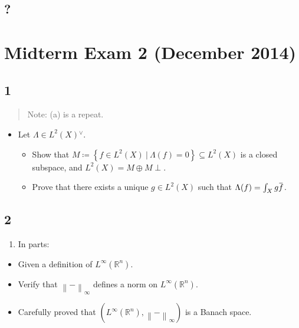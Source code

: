 \hypertarget{section}{%
\subsection{?}\label{section}}

\hypertarget{midterm-exam-2-december-2014}{%
\section{Midterm Exam 2 (December
2014)}\label{midterm-exam-2-december-2014}}

\hypertarget{section-1}{%
\subsection{1}\label{section-1}}

\begin{quote}
Note: (a) is a repeat.
\end{quote}

\begin{itemize}
\tightlist
\item
  Let \(\Lambda\in L^2(X) {}^{ \vee }\).

  \begin{itemize}
  \tightlist
  \item
    Show that
    \(M\coloneqq\left\{{f\in L^2(X) {~\mathrel{\Big|}~}\Lambda(f) = 0}\right\} \subseteq L^2(X)\)
    is a closed subspace, and \(L^2(X) = M \oplus M\perp\).
  \item
    Prove that there exists a unique \(g\in L^2(X)\) such that
    \(\Lambda(f) = \int_X g \mkern 1.5mu\overline{\mkern-1.5muf\mkern-1.5mu}\mkern 1.5mu\).
  \end{itemize}
\end{itemize}

\hypertarget{section-2}{%
\subsection{2}\label{section-2}}

\begin{enumerate}
\def\labelenumi{\alph{enumi}.}
\tightlist
\item
  In parts:
\end{enumerate}

\begin{itemize}
\tightlist
\item
  Given a definition of \(L^\infty({\mathbb{R}}^n)\).
\item
  Verify that \({\left\lVert {{-}} \right\rVert}_\infty\) defines a norm
  on \(L^\infty({\mathbb{R}}^n)\).
\item
  Carefully proved that
  \((L^\infty({\mathbb{R}}^n), {\left\lVert {{-}} \right\rVert}_\infty)\)
  is a Banach space.
\end{itemize}

